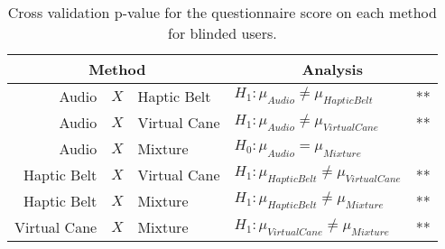 
\begin{table}[!htb]
\centering
\caption{Cross validation p-value for the questionnaire score on each method for blinded users.}
\label{tab:lsd_questionnaire_sight}
\begin{tabular}{rcllr}
\toprule
      \multicolumn{3}{c}{Method} &                          \multicolumn{2}{c}{Analysis} \\
\midrule
       Audio & $X$ & Haptic Belt &        $H_1 : \mu_{Audio} \ne \mu_{Haptic Belt}$ & ** \\
      Audio & $X$ & Virtual Cane &       $H_1 : \mu_{Audio} \ne \mu_{Virtual Cane}$ & ** \\
           Audio & $X$ & Mixture &                $H_0 : \mu_{Audio} = \mu_{Mixture}$ &  \\
Haptic Belt & $X$ & Virtual Cane & $H_1 : \mu_{Haptic Belt} \ne \mu_{Virtual Cane}$ & ** \\
     Haptic Belt & $X$ & Mixture &      $H_1 : \mu_{Haptic Belt} \ne \mu_{Mixture}$ & ** \\
    Virtual Cane & $X$ & Mixture &     $H_1 : \mu_{Virtual Cane} \ne \mu_{Mixture}$ & ** \\
\bottomrule
\end{tabular}
\end{table}

